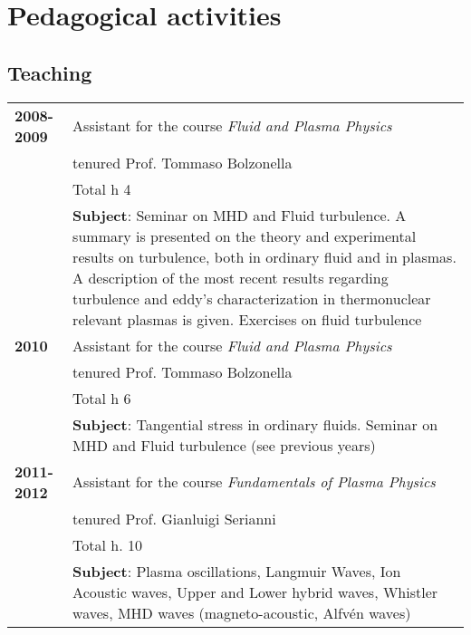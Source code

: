{\section{Pedagogical activities}
\subsection{Teaching}
\begin{longtable}{>{\bfseries}l p{15cm}}
2008-2009 & Assistant for the course \emph{Fluid and Plasma
  Physics} \\
& tenured
Prof. Tommaso Bolzonella  \\
 & Total h 4  \\ 
& \textbf{Subject}: Seminar on MHD and Fluid turbulence. 
A summary is presented on the theory and experimental results on turbulence, both in
ordinary fluid and in plasmas. A description of the most
recent results regarding turbulence and eddy’s characterization in
thermonuclear relevant plasmas is given. Exercises on fluid turbulence \\
2010 &  Assistant for the course \emph{Fluid and Plasma
  Physics} \\ 
& tenured
Prof. Tommaso Bolzonella  \\
 & Total h 6  \\
& \textbf{Subject}: Tangential stress in ordinary
fluids. Seminar on MHD and Fluid turbulence (see previous years)  \\
2011-2012 & Assistant for the course \emph{Fundamentals of Plasma
  Physics} \\ 
& tenured Prof. Gianluigi Serianni \\
& Total h. 10  \\
& \textbf{Subject}: Plasma oscillations, Langmuir Waves, Ion Acoustic
waves, Upper and Lower hybrid waves, Whistler waves, MHD waves
(magneto-acoustic, Alfv\'en waves)
\end{longtable}

}
